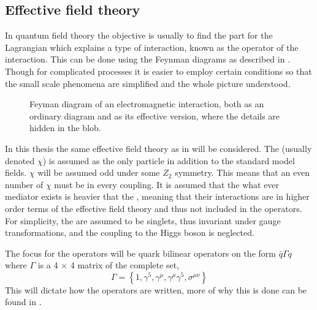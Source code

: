 \subsection{Effective field theory}
In quantum field theory the objective is usually to find the part for the Lagrangian which explains a type of interaction, known as the operator of the interaction. This can be done using the Feynman diagrams as described in . Though for complicated processes it is easier to employ certain conditions so that the small scale phenomena are simplified and the whole picture understood.

 \begin{figure}[!ht]
    \hfill
    \caption{Feyman diagram of an electromagnetic interaction, both as an ordinary diagram and as its effective version, where the details are hidden in the blob.}
    \label{fig:feymanc}
  \end{figure}

In this thesis the same effective field theory as in \citep{82.116010,Goodman:2010} will be considered. The \abbrWIMP (usually denoted $\chi$) is assumed as the only particle in addition to the standard model fields. $\chi$ will be assumed odd under some $Z_2$ symmetry. This means that an even number of $\chi$ must be in every coupling. It is assumed that the what ever mediator exists is heavier that the \abbrWIMPS, meaning that their interactions are in higher order terms of the effective field theory and thus not included in the operators. For simplicity, the \abbrWIMPS are assumed to be \abbrSM singlets, thus invariant under \abbrSM gauge transformations, and the coupling to the Higgs boson is neglected.

The focus for the operators will be quark bilinear operators on the form $\bar{q}\Gamma q$ where $\Gamma$ is a 4 $\times$ 4 matrix of the complete set, 
\begin{equation}
\Gamma = \left\lbrace 1,\gamma ^5,\gamma ^\mu,\gamma ^\mu \gamma ^5, \sigma ^{\mu \nu} \right\rbrace
\end{equation}
This will dictate how the operators are written, more of why this is done can be found in \citep{82.116010,Goodman:2010,Zee:2003}.

